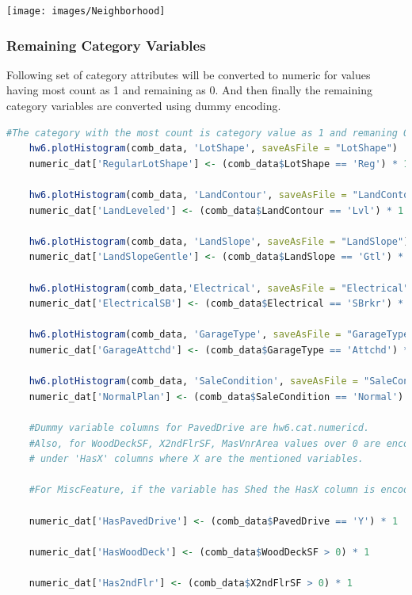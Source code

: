 \documentclass[sigconf]{acmart}
\begin{document}
	\begin{center}
		\texttt{[image: images/Neighborhood]}	
	\end{center}
	
	\subsubsection {Remaining Category Variables}

	
	Following set of category attributes will be converted to numeric for values having most count as 1 and remaining as 0. And then finally the remaining category variables are converted using dummy encoding.
	
	\begin{lstlisting}[language=R]
	#The category with the most count is category value as 1 and remaning 0
	hw6.plotHistogram(comb_data, 'LotShape', saveAsFile = "LotShape")
	numeric_dat['RegularLotShape'] <- (comb_data$LotShape == 'Reg') * 1
	
	hw6.plotHistogram(comb_data, 'LandContour', saveAsFile = "LandContour")
	numeric_dat['LandLeveled'] <- (comb_data$LandContour == 'Lvl') * 1
	
	hw6.plotHistogram(comb_data, 'LandSlope', saveAsFile = "LandSlope")
	numeric_dat['LandSlopeGentle'] <- (comb_data$LandSlope == 'Gtl') * 1
	
	hw6.plotHistogram(comb_data,'Electrical', saveAsFile = "Electrical")
	numeric_dat['ElectricalSB'] <- (comb_data$Electrical == 'SBrkr') * 1
	
	hw6.plotHistogram(comb_data, 'GarageType', saveAsFile = "GarageType")
	numeric_dat['GarageAttchd'] <- (comb_data$GarageType == 'Attchd') * 1
	
	hw6.plotHistogram(comb_data, 'SaleCondition', saveAsFile = "SaleCondition")
	numeric_dat['NormalPlan'] <- (comb_data$SaleCondition == 'Normal') * 1
	
	#Dummy variable columns for PavedDrive are hw6.cat.numericd. 
	#Also, for WoodDeckSF, X2ndFlrSF, MasVnrArea values over 0 are encoded as 1 
	# under 'HasX' columns where X are the mentioned variables. 
	
	#For MiscFeature, if the variable has Shed the HasX column is encoded for 1.
	
	numeric_dat['HasPavedDrive'] <- (comb_data$PavedDrive == 'Y') * 1
	
	numeric_dat['HasWoodDeck'] <- (comb_data$WoodDeckSF > 0) * 1
	
	numeric_dat['Has2ndFlr'] <- (comb_data$X2ndFlrSF > 0) * 1
	

\end{lstlisting}
\end{document}
